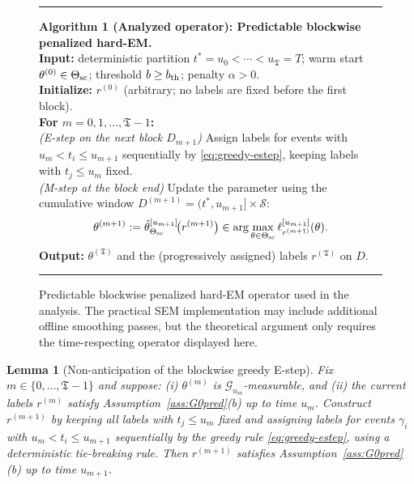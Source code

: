 \documentclass{statsoc}
\newtheorem{lemma}[lemma]{Lemma}
\newcommand{\1}{\mathbbm{1}}
\newcommand{\Tmax}{\mathfrak{T}}
\begin{document}
\begin{figure}[t]
\centering
\begin{minipage}{0.97\linewidth}
\hrule\vspace{0.6em}
\textbf{Algorithm 1 (Analyzed operator): Predictable blockwise penalized hard-EM.}\\[0.3em]
\textbf{Input:} deterministic partition $t^\ast=u_0<\cdots<u_{\Tmax}=T$; warm start $\theta^{(0)}\in\Theta_{\rm sc}$;
threshold $b\ge b_{\rm th}$; penalty $\alpha>0$.\\
\textbf{Initialize:} $r^{(0)}$ (arbitrary; no labels are fixed before the first block).\\[0.2em]
\textbf{For $m=0,1,\dots,\Tmax-1$:}\\
\quad\emph{(E-step on the next block $D_{m+1}$)} Assign labels for events with $u_m<t_i\le u_{m+1}$ sequentially by
\eqref{eq:greedy-estep}, keeping labels with $t_j\le u_m$ fixed.\\
\quad\emph{(M-step at the block end)} Update the parameter using the cumulative window $D^{(m+1)}=(t^\ast,u_{m+1}]\times\mathcal S$:
\[
\theta^{(m+1)} := \hat\theta_{\Theta_{\rm sc}}^{[u_{m+1}]}\!\big(r^{(m+1)}\big)
\in \arg\max_{\theta\in\Theta_{\rm sc}}\ell_{r^{(m+1)}}^{[u_{m+1}]}(\theta).
\]
\textbf{Output:} $\theta^{(\Tmax)}$ and the (progressively assigned) labels $r^{(\Tmax)}$ on $D$.
\vspace{0.6em}\hrule
\end{minipage}
\caption{Predictable blockwise penalized hard-EM operator used in the analysis. The practical SEM implementation may include additional offline smoothing passes, but the theoretical argument only requires the time-respecting operator displayed here.}
\label{alg:blockwise-hardem}
\end{figure}

\begin{lemma}[Non-anticipation of the blockwise greedy E-step]\label{lem:greedy-G0pred}
Fix $m\in\{0,\dots,\Tmax-1\}$ and suppose:
(i) $\theta^{(m)}$ is $\mathcal G_{u_m}$-measurable, and
(ii) the current labels $r^{(m)}$ satisfy Assumption~\ref{ass:G0pred}(b) up to time $u_m$. Construct $r^{(m+1)}$ by keeping all labels with $t_j\le u_m$ fixed and assigning labels for events $\gamma_i$ with $u_m<t_i\le u_{m+1}$ sequentially by the greedy rule \eqref{eq:greedy-estep}, using a deterministic tie-breaking rule.  Then $r^{(m+1)}$ satisfies Assumption~\ref{ass:G0pred}(b) up to time $u_{m+1}$.
\end{lemma}
\end{document}
